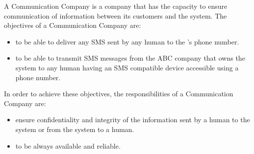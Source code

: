 A Communication Company is a company that has the capacity to ensure communication of information between its customers and the \msricrash system. 
The objectives of a Communication Company are:
\begin{itemize}
  \item to be able to deliver any SMS sent by any human to the \msricrash's phone number.
  \item to be able to transmit SMS messages from the ABC company that owns the \msricrash system to any human having an SMS compatible device accessible using a phone number.
\end{itemize}
\vspace{0.5cm}

In order to achieve these objectives, the responsibilities of a Communication Company are:
\begin{itemize}
  \item ensure confidentiality and integrity of the information sent by a human to the \msricrash system or from the system to a human.
  \item to be always available and reliable.
\end{itemize}
